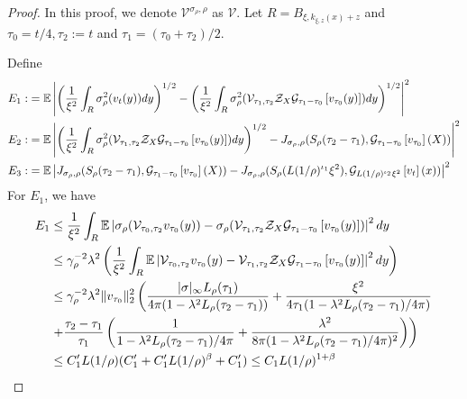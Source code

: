 \begin{proof}
    In this proof, we denote $\mathcal{V}^{\sigma_{\rho},\rho}$ as $\mathcal{V}$. Let $R = B_{\xi,k_{\xi,z}(x)+z}$ and $\tau_0 =  t/4,\tau_2:=t$ and $\tau_1 = (\tau_0+\tau_2)/2$.\par
    Define
    \[
    \begin{aligned}
        E_1 : &= \mathbb{E}\left\lvert \left(\dfrac{1}{\xi^2}\int_R \sigma_{\rho}^2(v_t(y))dy \right)^{1/2} - \left(\dfrac{1}{\xi^2}\int_R \sigma^2_{\rho}(\mathcal{V}_{\tau_1,\tau_2}\mathcal{Z}_X \mathcal{G}_{\tau_1-\tau_0}\left[{v_{\tau_0}(y)}\right])dy \right)^{1/2}\right\rvert^2 \\
        E_2 :&= \mathbb{E}\left\lvert \left(\dfrac{1}{\xi^2}\int_R \sigma^2_{\rho}(\mathcal{V}_{\tau_1,\tau_2}\mathcal{Z}_X \mathcal{G}_{\tau_1-\tau_0}\left[{v_{\tau_0}(y)}\right])dy \right)^{1/2}
        -
        J_{\sigma_{\rho},\rho}(S_{\rho}(\tau_2-\tau_1),\mathcal{G}_{\tau_1-\tau_0}\left[{v_{\tau_0}}\right](X))
        \right\rvert^2 \\
        E_3 :&= \mathbb{E}\left\lvert
        J_{\sigma_{\rho},\rho}(S_{\rho}(\tau_2-\tau_1),\mathcal{G}_{\tau_1-\tau_0}\left[{v_{\tau_0}}\right](X))
        -
        J_{\sigma_{\rho},\rho}(S_{\rho}(L(1/\rho)^{\iota_1}\xi^2),\mathcal{G}_{L(1/\rho)^{\iota_2}\xi^2}\left[{v_{t}}\right](x))
        \right\rvert^2
    \end{aligned}
    \]
    For $E_1$, we have
    \[
    \begin{aligned}
        E_1 &\leq \dfrac{1}{\xi^2}\int_R \mathbb{E}\left|\sigma_{\rho}(\mathcal{V}_{\tau_0,\tau_2}v_{\tau_0}(y)) - \sigma_{\rho}(\mathcal{V}_{\tau_1,\tau_2}\mathcal{Z}_X \mathcal{G}_{\tau_1-\tau_0}\left[{v_{\tau_0}(y)}\right])\right|^2dy \\
        &\leq \gamma_{\rho}^{-2}\lambda^2\left(\dfrac{1}{\xi^2} \int_R \mathbb{E}\left|\mathcal{V}_{\tau_0,\tau_2}v_{\tau_0}(y) - \mathcal{V}_{\tau_1,\tau_2}\mathcal{Z}_X \mathcal{G}_{\tau_1-\tau_0}\left[{v_{\tau_0}(y)}\right]\right|^2dy\right) \\
        &\leq \gamma_{\rho}^{-2}\lambda^2\lVert v_{\tau_0}\rVert_2^2
        \left( \dfrac{|\sigma|_{\infty}L_{\rho}(\tau_1)}{4\pi(1-\lambda^2L_{\rho}(\tau_2-\tau_1))} + \dfrac{\xi^2}{4\tau_1(1-\lambda^2L_{\rho}(\tau_2-\tau_1)/4\pi)}\right.\\
        &\left.+\dfrac{\tau_2-\tau_1}{\tau_1}\left(\dfrac{1}{1-\lambda^2L_{\rho}(\tau_2-\tau_1)/4\pi} + \dfrac{\lambda^2}{8\pi(1-\lambda^2L_{\rho}(\tau_2-\tau_1)/4\pi)^2}\right)\right) \\
        &\leq C'_1L(1/\rho)(C'_1+C'_1L(1/\rho)^{\beta} + C'_1) \leq C_1 L(1/\rho)^{1+\beta}
    \end{aligned}
\]
\end{proof}

